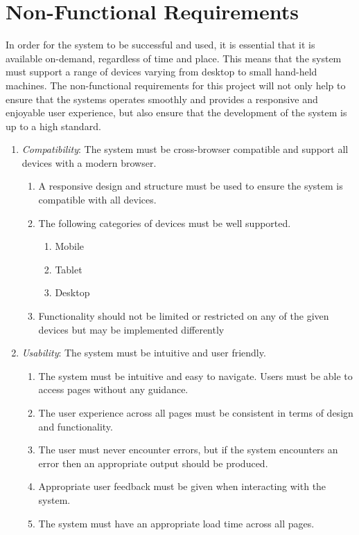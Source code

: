 \section{Non-Functional Requirements}
In order for the system to be successful and used, it is essential that it is available on-demand, regardless of time and place. This means that the system must support a range of devices varying from desktop to small hand-held machines. The non-functional requirements for this project will not only help to ensure that the systems operates smoothly and provides a responsive and enjoyable user experience, but also ensure that the development of the system is up to a high standard.
\begin{enumerate}[label=\textbf{NF\arabic*}]
	\item \textit{Compatibility}: The system must be cross-browser compatible and support all devices with a modern browser.
		\begin{enumerate}
			\item A responsive design and structure must be used to ensure the system is compatible with all devices.
			\item The following categories of devices must be well supported.
			\begin{enumerate}
				\item Mobile
				\item Tablet
				\item Desktop
			\end{enumerate}
			\item Functionality should not be limited or restricted on any of the given devices but may be implemented differently
		\end{enumerate}
	\item \textit{Usability}: The system must be intuitive and user friendly.
		\begin{enumerate}
			\item The system must be intuitive and easy to navigate. Users must be able to access pages without any guidance.
			\item The user experience across all pages must be consistent in terms of design and functionality.
			\item The user must never encounter errors, but if the system encounters an error then an appropriate output should be produced.
			\item Appropriate user feedback must be given when interacting with the system.
			\item The system must have an appropriate load time across all pages.

\end{enumerate}
\end{enumerate}
